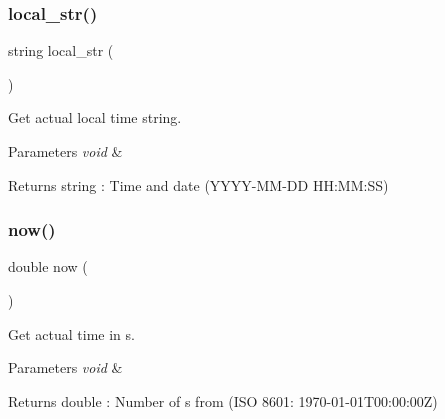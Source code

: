 \subsubsection{local\_str()}
{\footnotesize\ttfamily string local\+\_\+str (\begin{DoxyParamCaption}\item[{void}]{ }\end{DoxyParamCaption})}



Get actual local time string. 


\begin{DoxyCode}{0}
\end{DoxyCode}



\begin{DoxyParams}{Parameters}
{\em void} & \\
\hline
\end{DoxyParams}
\begin{DoxyReturn}{Returns}
string \+: Time and date (Y\+Y\+Y\+Y-\/\+M\+M-\/\+DD H\+H\+:\+MM\+:SS) 
\end{DoxyReturn}
\mbox{\label{classtime_a5602e9c6b2da7a1db11ed8a76d19fde3}} 
\subsubsection{now()}
{\footnotesize\ttfamily double now (\begin{DoxyParamCaption}\item[{void}]{ }\end{DoxyParamCaption})}



Get actual time in s. 


\begin{DoxyCode}{0}
\end{DoxyCode}



\begin{DoxyParams}{Parameters}
{\em void} & \\
\hline
\end{DoxyParams}
\begin{DoxyReturn}{Returns}
double \+: Number of s from (I\+SO 8601\+: 1970-\/01-\/01T00\+:00\+:00Z) 
\end{DoxyReturn}
\mbox{\label{classtime_a2a7a51110c7f6cb8331a444312a37c71}} 
